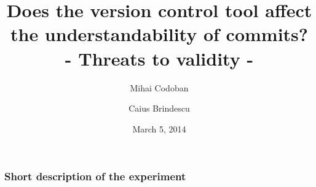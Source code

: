 \documentclass{beamer}
\title{Does the version control tool affect the understandability of commits? \\ - Threats to validity - }
\author{Mihai Codoban \and Caius Brindescu}
\date{March 5, 2014}
\begin{document}
\begin{frame}
\titlepage
\end{frame}

\begin{frame}
\frametitle{Short description of the experiment}

\end{frame}
\end{document}
